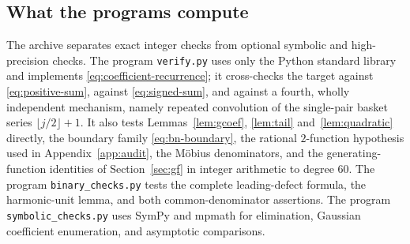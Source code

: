 \documentclass[11pt,a4paper]{article}
\numberwithin{equation}{section}
\theoremstyle{definition}
\theoremstyle{remark}
\begin{document}
\subsection{What the programs compute}
The archive separates exact integer checks from optional symbolic and
high-precision checks. The program \texttt{verify.py} uses only the Python
standard library and implements \eqref{eq:coefficient-recurrence}; it
cross-checks the target against \eqref{eq:positive-sum}, against
\eqref{eq:signed-sum}, and against a fourth, wholly independent mechanism,
namely repeated convolution of the single-pair basket series
$\lfloor j/2\rfloor+1$. It also tests
Lemmas~\ref{lem:gcoef}, \ref{lem:tail} and~\ref{lem:quadratic} directly, the
boundary family \eqref{eq:bn-boundary}, the rational $2$-function hypothesis
used in Appendix~\ref{app:audit}, the M\"obius denominators, and the
generating-function identities of Section~\ref{sec:gf} in integer arithmetic
to degree $60$. The program \texttt{binary\_checks.py} tests the complete
leading-defect formula, the harmonic-unit lemma, and both common-denominator
assertions. The program \texttt{symbolic\_checks.py} uses SymPy and mpmath
for elimination, Gaussian coefficient enumeration, and asymptotic
comparisons.
\end{document}
